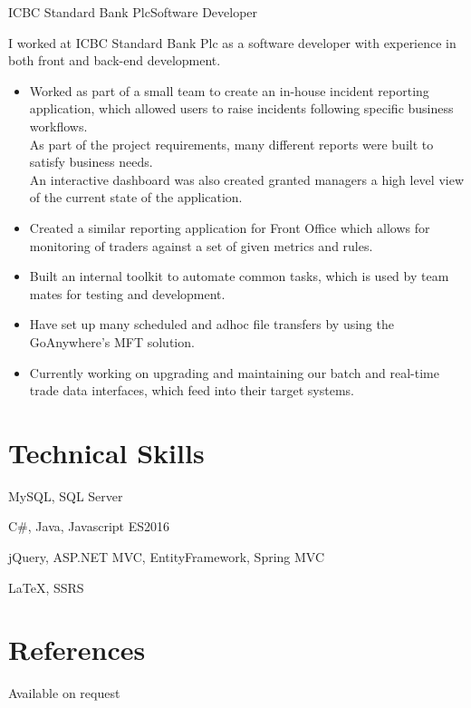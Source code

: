 \documentclass[10pt,a4paper]{moderncv}
\begin{document}
        {ICBC Standard Bank Plc}{Software Developer}{}{}
        {
        I worked at ICBC Standard Bank Plc as a software developer with experience in both front and back-end development.
        \begin{itemize}
            \item Worked as part of a small team to create an in-house incident reporting application, which allowed users to raise incidents following specific business workflows.\\
            As part of the project requirements, many different reports were built to satisfy business needs.\\
            An interactive dashboard was also created granted managers a high level view of the current state of the application.\\
            \item Created a similar reporting application for Front Office which allows for monitoring of traders against a set of given metrics and rules.
            \item Built an internal toolkit to automate common tasks, which is used by team mates for testing and development.
            \item Have set up many scheduled and adhoc file transfers by using the GoAnywhere's MFT solution.
            \item Currently working on upgrading and maintaining our batch and real-time trade data interfaces, which feed into their target systems.
        \end{itemize}
        }
    
    
    
    
        \section{Technical Skills}
        {MySQL, SQL Server}
        {}
        {}
    
        {C\#, Java, Javascript ES2016}
        {}
        {}
    
        {jQuery, ASP.NET MVC, EntityFramework, Spring MVC}
        {}
        {}
    
        {LaTeX, SSRS}
        {}
        {}
    
        \section{References}
        \qquad \qquad \qquad \quad Available on request
    
    
\end{document}
